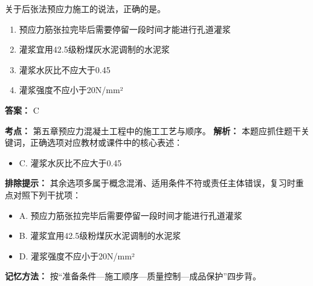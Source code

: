 \documentclass[UTF8,fontset=fandol,11pt]{ctexart}
\begin{document}
\vspace{0.2em}

\begin{quizbox}[title={第 5 题}]
关于后张法预应力施工的说法，正确的是。\\
\begin{enumerate}[label=\Alph*.]
\item 预应力筋张拉完毕后需要停留一段时间才能进行孔道灌浆
\item 灌浆宜用42.5级粉煤灰水泥调制的水泥浆
\item 灌浆水灰比不应大于0.45
\item 灌浆强度不应小于20N/mm²
\end{enumerate}
\textbf{答案：} C
\vspace{0.25em}
\begin{answerbox}[title={考点解析}]
\textbf{考点：} 第五章预应力混凝土工程中的施工工艺与顺序。
\textbf{解析：} 本题应抓住题干关键词，正确选项对应教材或课件中的核心表述：
\begin{itemize}
\item C. 灌浆水灰比不应大于0.45
\end{itemize}
\textbf{排除提示：} 其余选项多属于概念混淆、适用条件不符或责任主体错误，复习时重点对照下列干扰项：
\begin{itemize}
\item A. 预应力筋张拉完毕后需要停留一段时间才能进行孔道灌浆
\item B. 灌浆宜用42.5级粉煤灰水泥调制的水泥浆
\item D. 灌浆强度不应小于20N/mm²
\end{itemize}
\textbf{记忆方法：} 按“准备条件—施工顺序—质量控制—成品保护”四步背。
\end{answerbox}
\end{quizbox}

\vspace{0.2em}
\end{document}
